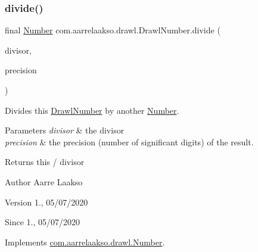 \subsubsection{\texorpdfstring{divide()}{divide()}\hspace{0.1cm}{\footnotesize\ttfamily [2/3]}}
{\footnotesize\ttfamily final \hyperlink{interfacecom_1_1aarrelaakso_1_1drawl_1_1_number}{Number} com.\+aarrelaakso.\+drawl.\+Drawl\+Number.\+divide (\begin{DoxyParamCaption}\item[{@Not\+Null final \hyperlink{interfacecom_1_1aarrelaakso_1_1drawl_1_1_number}{Number}}]{divisor,  }\item[{final int}]{precision }\end{DoxyParamCaption})}



Divides this \hyperlink{classcom_1_1aarrelaakso_1_1drawl_1_1_drawl_number}{Drawl\+Number} by another \hyperlink{interfacecom_1_1aarrelaakso_1_1drawl_1_1_number}{Number}. 


\begin{DoxyParams}{Parameters}
{\em divisor} & the divisor \\
\hline
{\em precision} & the precision (number of significant digits) of the result. \\
\hline
\end{DoxyParams}
\begin{DoxyReturn}{Returns}
this / divisor 
\end{DoxyReturn}
\begin{DoxyAuthor}{Author}
Aarre Laakso 
\end{DoxyAuthor}
\begin{DoxyVersion}{Version}
1., 05/07/2020 
\end{DoxyVersion}
\begin{DoxySince}{Since}
1., 05/07/2020 
\end{DoxySince}


Implements \hyperlink{interfacecom_1_1aarrelaakso_1_1drawl_1_1_number_acfcd993a82faa41956430086986084e7}{com.\+aarrelaakso.\+drawl.\+Number}.

\mbox{\label{classcom_1_1aarrelaakso_1_1drawl_1_1_drawl_number_a4ba0f1728e95fe494d440c04228041f7}} 
